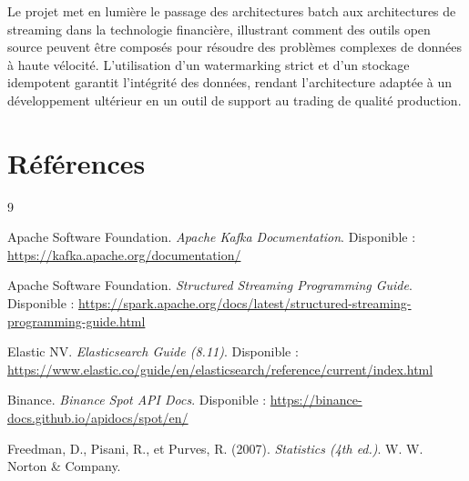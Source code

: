 \documentclass[12pt, a4paper]{article}
\begin{document}
Le projet met en lumi\`ere le passage des architectures batch aux architectures de streaming dans la technologie financi\`ere, illustrant comment des outils open source peuvent \^etre compos\'es pour r\'esoudre des probl\`emes complexes de donn\'ees \`a haute v\'elocit\'e. L'utilisation d'un watermarking strict et d'un stockage idempotent garantit l'int\'egrit\'e des donn\'ees, rendant l'architecture adapt\'ee \`a un d\'eveloppement ult\'erieur en un outil de support au trading de qualit\'e production.

\section*{R\'ef\'erences}

\begin{thebibliography}{9}

Apache Software Foundation.
\textit{Apache Kafka Documentation}.
Disponible : \url{https://kafka.apache.org/documentation/}

Apache Software Foundation.
\textit{Structured Streaming Programming Guide}.
Disponible : \url{https://spark.apache.org/docs/latest/structured-streaming-programming-guide.html}

Elastic NV.
\textit{Elasticsearch Guide (8.11)}.
Disponible : \url{https://www.elastic.co/guide/en/elasticsearch/reference/current/index.html}

Binance.
\textit{Binance Spot API Docs}.
Disponible : \url{https://binance-docs.github.io/apidocs/spot/en/}

Freedman, D., Pisani, R., et Purves, R. (2007).
\textit{Statistics (4th ed.)}. W. W. Norton \& Company.

\end{thebibliography}
\end{document}
